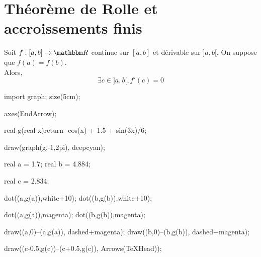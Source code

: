 \part{Théorème de Rolle et accroissements finis}

\begin{thm}
	Soit $f: [a,b] \to \R$ continue sur $[a,b]$ et dérivable sur $]a,b[$. On suppose que $f(a) = f(b)$.\\
	Alors, \[
		\exists c \in ]a,b[, f'(c) = 0
	\]
	\begin{center}
		\begin{asy}
			import graph;
			size(5cm);

			axes(EndArrow);

			real g(real x){return -cos(x) + 1.5 + sin(3x)/6;}

			draw(graph(g,-1,2pi), deepcyan);

			real a = 1.7; real b = 4.884;

			real c = 2.834;
			
			dot((a,g(a)),white+10);
			dot((b,g(b)),white+10);


			dot((a,g(a)),magenta);
			dot((b,g(b)),magenta);

			draw((a,0)--(a,g(a)), dashed+magenta);
			draw((b,0)--(b,g(b)), dashed+magenta);

			draw((c-0.5,g(c))--(c+0.5,g(c)), Arrows(TeXHead));
		\end{asy}
	\end{center}
\end{thm}

